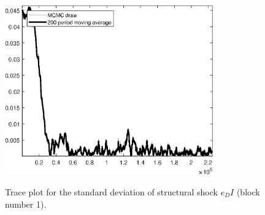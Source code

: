 \begin{figure}[H]
\centering
  \includegraphics[width=0.8\textwidth]{BRS_sectoral/graphs/TracePlot_SE_e_DI_blck_1}\\
    \caption{Trace plot for the standard deviation of structural shock ${e_DI}$ (block number 1).}
\end{figure}
